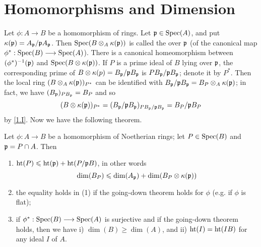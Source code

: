 \documentclass[../main]{subfiles}
\begin{document}
\section{Homomorphisms and Dimension}\label{sec:13}

\newparagraph Let $\phi: A \longrightarrow B$ be a homomorphism of rings. Let $\mathfrak{p} \in\operatorname{Spec}(A)$, and put $\kappa(\mathfrak{p})=A_{\mathfrak{p}} /\mathfrak{p}A_{\mathfrak{p}}$. Then $\operatorname{Spec}(B\otimes_A\kappa(\mathfrak{p}))$ is called the  over $\mathfrak{p}$ (of the canonical map $\phi^\ast: \operatorname{Spec}(B) \longrightarrow\operatorname{Spec}(A)$). There is a canonical homeomorphism between $(\phi^\ast)^{-1}(\mathfrak{p})$ and $\operatorname{Spec}(B \otimes \kappa(\mathfrak{p}))$. If $P$ is a prime ideal of $B$ lying over $\mathfrak{p}$, the corresponding prime of $B \otimes \kappa(p)=B_{\mathfrak{p}} / \mathfrak{p}B_{\mathfrak{p}}$ is $PB_{\mathfrak{p}} / \mathfrak{p}B_{\mathfrak{p}}$; denote it by $P^*$. Then the local ring $(B \otimes_A \kappa(\mathfrak{p}))_{P^*}$ can be identified with $B_{\mathfrak{p}} / \mathfrak{p}B_{\mathfrak{p}}=B_P\otimes_A \kappa(\mathfrak{p})$; in fact, we have $(B_{\mathfrak{p}})_{PB_{\mathfrak{p}}}=B_P$ and so \[(B \otimes \kappa(\mathfrak{p}))_{P^*}=(B_{\mathfrak{p}} / \mathfrak{p}B_{\mathfrak{p}})_{PB_{\mathfrak{p}}/\mathfrak{p}B_{\mathfrak{p}}}=B_P /\mathfrak{p}B_P\] by \ref{1.I}. Now we have the following theorem.

\begin{partheorem}\label{thm:019}
Let $\phi: A\longrightarrow B$ be a homomorphism of Noetherian rings; let $P \in \operatorname{Spec}(B)$ and $\mathfrak{p}=P \cap A$. Then
\begin{enumerate}[label=(\arabic*)]
    \item $\operatorname{ht}(P)\leqslant\operatorname{ht}(\mathfrak{p})+\operatorname{ht}(P/\mathfrak{p}B)$, in other words \[\operatorname{dim}(B_P) \leqslant \operatorname{dim}(A_{\mathfrak{p}})+\operatorname{dim}(B_P \otimes \kappa(\mathfrak{p}))\]

    \item the equality holds in (1) if the going-down theorem holds for $\phi$ (e.g. if $\phi$ is flat);

    \item if $\phi^\ast:\operatorname{Spec}(B)\longrightarrow \operatorname{Spec}(A)$ is surjective and if the going-down theorem holds, then we have i) $\dim(B) \geqslant \dim(A)$, and ii) $\operatorname{ht}(I)=\operatorname{ht}(IB)$ for any ideal $I$ of $A$.
\end{enumerate}
\end{partheorem}
\end{document}
